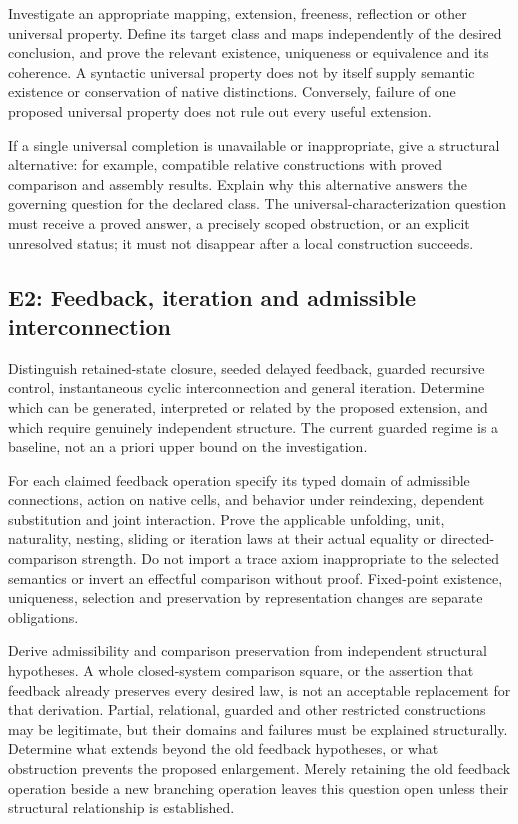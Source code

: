 \documentclass[11pt]{article}
\begin{document}
Investigate an appropriate mapping, extension, freeness, reflection or other universal property. Define its target class and maps independently of the desired conclusion, and prove the relevant existence, uniqueness or equivalence and its coherence. A syntactic universal property does not by itself supply semantic existence or conservation of native distinctions. Conversely, failure of one proposed universal property does not rule out every useful extension.

If a single universal completion is unavailable or inappropriate, give a structural alternative: for example, compatible relative constructions with proved comparison and assembly results. Explain why this alternative answers the governing question for the declared class. The universal-characterization question must receive a proved answer, a precisely scoped obstruction, or an explicit unresolved status; it must not disappear after a local construction succeeds.

\subsection*{E2: Feedback, iteration and admissible interconnection}
Distinguish retained-state closure, seeded delayed feedback, guarded recursive control, instantaneous cyclic interconnection and general iteration. Determine which can be generated, interpreted or related by the proposed extension, and which require genuinely independent structure. The current guarded regime is a baseline, not an a priori upper bound on the investigation.

For each claimed feedback operation specify its typed domain of admissible connections, action on native cells, and behavior under reindexing, dependent substitution and joint interaction. Prove the applicable unfolding, unit, naturality, nesting, sliding or iteration laws at their actual equality or directed-comparison strength. Do not import a trace axiom inappropriate to the selected semantics or invert an effectful comparison without proof. Fixed-point existence, uniqueness, selection and preservation by representation changes are separate obligations.

Derive admissibility and comparison preservation from independent structural hypotheses. A whole closed-system comparison square, or the assertion that feedback already preserves every desired law, is not an acceptable replacement for that derivation. Partial, relational, guarded and other restricted constructions may be legitimate, but their domains and failures must be explained structurally. Determine what extends beyond the old feedback hypotheses, or what obstruction prevents the proposed enlargement. Merely retaining the old feedback operation beside a new branching operation leaves this question open unless their structural relationship is established.
\end{document}
